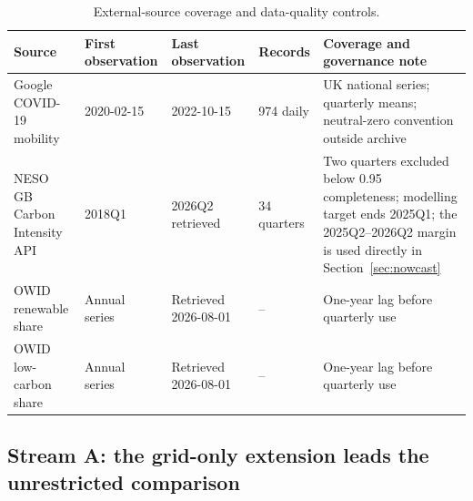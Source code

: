 \documentclass[preprint,12pt]{elsarticle}
\begin{document}
\begin{table}[!htbp]
\centering
\scriptsize
\setlength{\tabcolsep}{3.5pt}
\renewcommand{\arraystretch}{0.92}
\caption{External-source coverage and data-quality controls.}
\label{tab:source_quality}
\begin{tabularx}{\textwidth}{@{}p{3.1cm}p{2.0cm}p{2.0cm}p{1.4cm}Y@{}}
\toprule
Source & First observation & Last observation & Records & Coverage and governance note \\
\midrule
Google COVID-19 mobility & 2020-02-15 & 2022-10-15 & 974 daily & UK national series; quarterly means; neutral-zero convention outside archive \\
NESO GB Carbon Intensity API & 2018Q1 & 2026Q2 retrieved & 34 quarters & Two quarters excluded below 0.95 completeness; modelling target ends 2025Q1; the 2025Q2--2026Q2 margin is used directly in Section~\ref{sec:nowcast} \\
OWID renewable share & Annual series & Retrieved 2026-08-01 & -- & One-year lag before quarterly use \\
OWID low-carbon share & Annual series & Retrieved 2026-08-01 & -- & One-year lag before quarterly use \\
\bottomrule
\end{tabularx}
\end{table}

\subsection{Stream A: the grid-only extension leads the unrestricted comparison}
\end{document}
